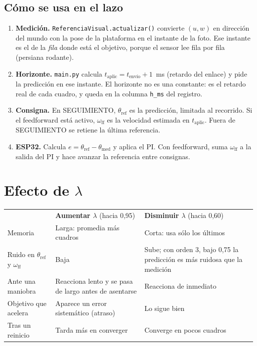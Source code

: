\documentclass[11pt,a4paper]{article}
\newcommand{\cod}[1]{\texttt{#1}}
\newcommand{\lam}{\lambda}
\begin{document}
\subsection{Cómo se usa en el lazo}

\begin{enumerate}
  \item \textbf{Medición.} \cod{ReferenciaVisual.actualizar()} convierte $(u, w)$ en dirección del mundo con
        la pose de la plataforma en el instante de la foto. Ese instante es el de la \emph{fila} donde está el
        objetivo, porque el sensor lee fila por fila (persiana rodante).
  \item \textbf{Horizonte.} \cod{main.py} calcula $t_{\mathrm{aplic}} = t_{\mathrm{envío}} + 1$~ms (retardo del
        enlace) y pide la predicción en ese instante. El horizonte no es una constante: es el retardo real de
        cada cuadro, y queda en la columna \cod{h\_ms} del registro.
  \item \textbf{Consigna.} En SEGUIMIENTO, $\theta_{\mathrm{ref}}$ es la predicción, limitada al recorrido. Si el
        feedforward está activo, $\omega_{\mathrm{ff}}$ es la velocidad estimada en $t_{\mathrm{aplic}}$. Fuera de
        SEGUIMIENTO se retiene la última referencia.
  \item \textbf{ESP32.} Calcula $e = \theta_{\mathrm{ref}} - \theta_{\mathrm{med}}$ y aplica el PI. Con feedforward,
        suma $\omega_{\mathrm{ff}}$ a la salida del PI y hace avanzar la referencia entre consignas.
\end{enumerate}

\section{Efecto de \texorpdfstring{$\lam$}{lambda}}
\label{sec:lambda}

\begin{clave}[title={¿Qué pasa al aumentar o disminuir $\lam$?}]
\begin{tabularx}{\linewidth}{@{}>{\raggedright\arraybackslash}p{3.1cm}>{\raggedright\arraybackslash}X>{\raggedright\arraybackslash}X@{}}
 & \textbf{Aumentar $\lam$} (hacia 0,95) & \textbf{Disminuir $\lam$} (hacia 0,60) \\[2pt]
Memoria & Larga: promedia más cuadros & Corta: usa sólo los últimos \\
Ruido en $\theta_{\mathrm{ref}}$ y $\omega_{\mathrm{ff}}$ & Baja & Sube; con orden 3, bajo 0,75 la predicción es más ruidosa que la medición \\
Ante una maniobra & Reacciona lento y se pasa de largo antes de asentarse & Reacciona de inmediato \\
Objetivo que acelera & Aparece un error sistemático (atraso) & Lo sigue bien \\
Tras un reinicio & Tarda más en converger & Converge en pocos cuadros \\
\end{tabularx}
\end{clave}
\end{document}
